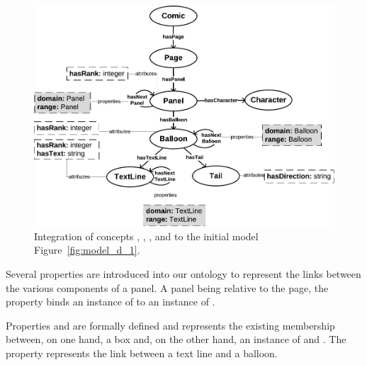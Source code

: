 \begin{figure}[h!]
\begin{center}
\includegraphics[width=1\textwidth]{model_step2_new.pdf}
\caption[Complete comics model]{Integration of concepts , , ,  and  to the initial model Figure~\ref{fig:model_d_1}.}
\label{fig:model_d_2}
\end{center}
\end{figure}

Several properties are introduced into our ontology to represent the links between the various components of a panel.
A panel being relative to the page, the property  binds an instance of  to an instance of .

Properties  and  are formally defined and represents the existing membership between, on one hand, a box and, on the other hand, an instance of  and .
The property  represents the link between a text line and a balloon.


